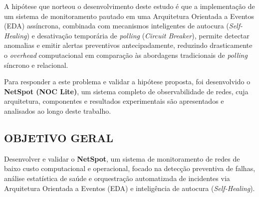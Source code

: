 \documentclass[12pt,a4paper]{article}
\begin{document}
A hipótese que norteou o desenvolvimento deste estudo é que a implementação de um sistema de monitoramento pautado em uma Arquitetura Orientada a Eventos (EDA) assíncrona, combinada com mecanismos inteligentes de autocura (\textit{Self-Healing}) e desativação temporária de \textit{polling} (\textit{Circuit Breaker}), permite detectar anomalias e emitir alertas preventivos antecipadamente, reduzindo drasticamente o \textit{overhead} computacional em comparação às abordagens tradicionais de \textit{polling} síncrono e relacional.

Para responder a este problema e validar a hipótese proposta, foi desenvolvido o \textbf{NetSpot (NOC Lite)}, um sistema completo de observabilidade de redes, cuja arquitetura, componentes e resultados experimentais são apresentados e analisados ao longo deste trabalho.

\subsection{OBJETIVO GERAL}
Desenvolver e validar o \textbf{NetSpot}, um sistema de monitoramento de redes de baixo custo computacional e operacional, focado na detecção preventiva de falhas, análise estatística de saúde e orquestração automatizada de incidentes via Arquitetura Orientada a Eventos (EDA) e inteligência de autocura (\textit{Self-Healing}).
\end{document}
